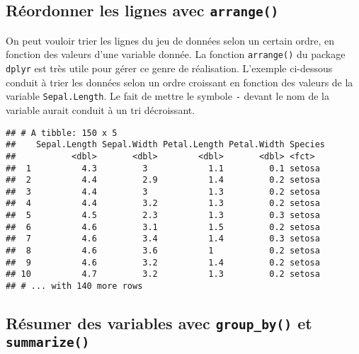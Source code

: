 \documentclass[
  french,
]{book}
\newenvironment{Shaded}{\begin{snugshade}}{\end{snugshade}}
\newcommand{\KeywordTok}[1]{\textcolor[rgb]{0.13,0.29,0.53}{\textbf{#1}}}
\newcommand{\NormalTok}[1]{#1}
\newcommand{\OperatorTok}[1]{\textcolor[rgb]{0.81,0.36,0.00}{\textbf{#1}}}
\newcommand{\StringTok}[1]{\textcolor[rgb]{0.31,0.60,0.02}{#1}}
\begin{document}
\hypertarget{ruxe9ordonner-les-lignes-avec-arrange}{%
\subsection{\texorpdfstring{Réordonner les lignes avec \texttt{arrange()}}{Réordonner les lignes avec arrange()}}\label{ruxe9ordonner-les-lignes-avec-arrange}}

On peut vouloir trier les lignes du jeu de données selon un certain ordre, en fonction des valeurs d'une variable donnée. La fonction \texttt{arrange()} du package \texttt{dplyr} est très utile pour gérer ce genre de réalisation. L'exemple ci-dessous conduit à trier les données selon un ordre croissant en fonction des valeurs de la variable \texttt{Sepal.Length}. Le fait de mettre le symbole \texttt{-} devant le nom de la variable aurait conduit à un tri décroissant.

\begin{Shaded}
\end{Shaded}

\begin{verbatim}
## # A tibble: 150 x 5
##    Sepal.Length Sepal.Width Petal.Length Petal.Width Species
##           <dbl>       <dbl>        <dbl>       <dbl> <fct>  
##  1          4.3         3            1.1         0.1 setosa 
##  2          4.4         2.9          1.4         0.2 setosa 
##  3          4.4         3            1.3         0.2 setosa 
##  4          4.4         3.2          1.3         0.2 setosa 
##  5          4.5         2.3          1.3         0.3 setosa 
##  6          4.6         3.1          1.5         0.2 setosa 
##  7          4.6         3.4          1.4         0.3 setosa 
##  8          4.6         3.6          1           0.2 setosa 
##  9          4.6         3.2          1.4         0.2 setosa 
## 10          4.7         3.2          1.3         0.2 setosa 
## # ... with 140 more rows
\end{verbatim}

\hypertarget{ruxe9sumer-des-variables-avec-group_by-et-summarize}{%
\subsection{\texorpdfstring{Résumer des variables avec \texttt{group\_by()} et \texttt{summarize()}}{Résumer des variables avec group\_by() et summarize()}}\label{ruxe9sumer-des-variables-avec-group_by-et-summarize}}
\end{document}
